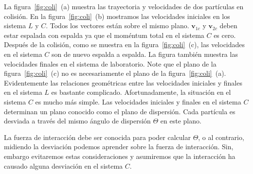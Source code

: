 La figura~\ref{fig:coli}~(a) muestra las trayectoria y velocidades de
dos partículas en colisión.  
En la figura~\ref{fig:coli}~(b) mostramos las velocidades iniciales en
los sistema $L$ y $C$.
Todos los vectores están sobre el mismo plano.
$\mathbf{v}_{1c}$ y $\mathbf{v}_{2c}$ deben estar espalada con espalda
ya que el moméntum total en el sistema $C$ es cero. 
Después de la colisión, como se muestra en la
figura~\ref{fig:coli}~(c), las velocidades en el sistema $C$ son de
nuevo espalda a espalda. 
La figura también muestra las velocidades
finales en el sistema de laboratorio.
Note que el plano de la figura~\ref{fig:coli}~(c) no es necesariamente
el plano de la figura~\ref{fig:coli}~(a). 
Evidentemente las relaciones geométricas entre las velocidades
iniciales y finales en el sistema $L$ es bastante complicado. 
Afortunadamente, la situación en el sistema $C$ es mucho más simple. 
Las velocidades iniciales y finales en el sistema $C$ determinan un
plano conocido como el plano de dispersión. 
Cada partícula es desviada a través del mismo ángulo de dispersión
$\Theta$ en este plano.

La fuerza de interacción debe ser conocida para poder calcular
$\Theta$, o al contrario, midiendo la desviación podemos aprender
sobre la fuerza de interacción. Sin, embargo evitaremos estas
consideraciones y asumiremos que la interacción ha causado alguna
desviación en el sistema $C$.


